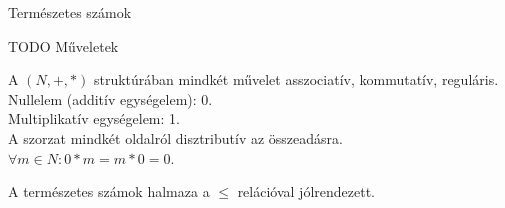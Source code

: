 \begin{frame}

\begin{tcolorbox}
{\Huge Természetes számok}
\end{tcolorbox}
\end{frame}

\begin{frame}
\begin{tcolorbox}[title={Def.: Peano-axiómák}]
\end{tcolorbox}

\begin{tcolorbox}[title={Ész}]
\end{tcolorbox}

\begin{tcolorbox}[title={Def.: Természetes számok halmaza}]
\end{tcolorbox}
\end{frame}

\begin{frame}
\begin{tcolorbox}[title={Def.:}]
TODO Műveletek
\end{tcolorbox}
\end{frame}

\begin{frame}
\begin{tcolorbox}[title={Tétel: Természetes számok}]
A $(N, +, *)$ struktúrában mindkét művelet asszociatív, kommutatív, reguláris.\\
Nullelem (additív egységelem): 0.\\
Multiplikatív egységelem: 1.\\
A szorzat mindkét oldalról disztributív az összeadásra.\\
${\forall}m \in N : 0 * m = m * 0 = 0$.
\end{tcolorbox}
\end{frame}

\begin{frame}
\begin{tcolorbox}[title={Def.: $\mathbb{N}$ rendezése}]
\end{tcolorbox}

\begin{tcolorbox}[title={Tétel: N rendezése}]
A természetes számok halmaza a $\leq$ relációval jólrendezett.
\end{tcolorbox}

\begin{tcolorbox}[title={Def.: Végtelen sorozatok}]
\end{tcolorbox}


\begin{tcolorbox}[title={Ész}]
\end{tcolorbox}
\end{frame}


